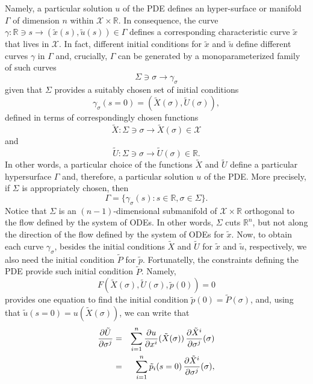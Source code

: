 \documentclass[11pt,spanish]{article}
\newcommand{\RR}{\mathbb{R}}
\begin{document}
Namely, a particular solution $u$ of the PDE defines an hyper-surface or manifold $\Gamma$ of dimension $n$ within $\mathcal X\times \RR$.
In consequence, the curve $\gamma : \RR\ni s\to (\tilde x(s),\tilde u(s))\in \Gamma$ defines a corresponding characteristic curve $\tilde x$ that lives in $\mathcal X$.
In fact, different initial conditions for $\tilde x$ and $\tilde u$ define different curves $\gamma$ in $\Gamma$ and, crucially, $\Gamma$ can be generated by a monoparameterized family
of such curves 
$$
\Sigma\ni \sigma\to \gamma_{\sigma}
$$ 
given that $\Sigma$ provides a suitably chosen set of initial conditions
$$
\gamma_{\sigma}(s=0)
=
(\tilde X(\sigma),\tilde U(\sigma)),
$$
defined in terms of correspondingly chosen functions 
$$
\tilde X:\Sigma \ni \sigma \to \tilde X(\sigma)\in \mathcal X
$$
and
$$
\tilde U:\Sigma \ni \sigma \to \tilde U(\sigma)\in \RR.
$$
In other words, a particular choice of the functions $\tilde X$ and $\tilde U$ define a particular hypersurface $\Gamma$ and, therefore, a particular solution $u$ of the PDE.
More precisely, if $\Sigma$ is appropriately chosen, then
\begin{equation}
\label{eq:XX1}
\Gamma
=\{\gamma_{\sigma}(s):s\in \RR,\sigma\in \Sigma\}.
\end{equation}
Notice that $\Sigma$ is an $(n-1)$-dimensional submanifold of $\mathcal X\times \RR$ orthogonal to the flow defined by the system of ODEs.
In other words, $\Sigma$ cuts $\RR^n$, but not along the direction of the flow defined by the system of ODEs for $\tilde x$.
Now, to obtain each curve $\gamma_{\sigma}$, besides the initial conditions $\tilde X$ and $\tilde U$ for $\tilde x$ and $\tilde u$, respectively, we also need the initial condition $\tilde P$ for $\tilde p$.
Fortunatelly, the constraints defining the PDE provide such initial condition $\tilde P$.
Namely,
\begin{equation}
\label{eq:ZZ5}
F(\tilde X(\sigma),\tilde U(\sigma),\tilde p(0))=0
\end{equation}
provides one equation to find the initial condition $\tilde p(0)=\tilde P(\sigma)$, and, using that $\tilde u(s=0)=u(\tilde X(\sigma))$, we can write  that
\begin{eqnarray}
\label{eq:ZZ6}
\frac{\partial \tilde U}{\partial \sigma^j}
&=&
\sum_{i=1}^n
\frac{\partial u}{\partial x^i}(\tilde X(\sigma))
\,
\frac{\partial \tilde X^i}{\partial \sigma^j}(\sigma)
\notag
\\
&=&
\sum_{i=1}^n
\tilde p_i(s=0)
\,
\frac{\partial \tilde X^i}{\partial \sigma^j}(\sigma)
,
\notag
\end{eqnarray}
\end{document}
